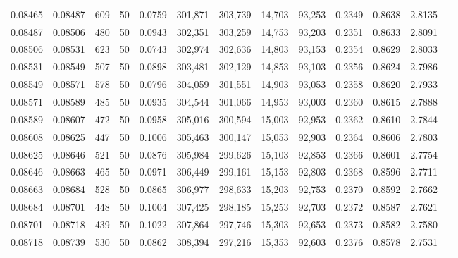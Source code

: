 \begin{tabular}{rrrrrrrrrrrrr}
0.08465 & 0.08487 &   609 &  50 &                                     0.0759 & 301,871 & 303,739 &  14,703 &  93,253 & 0.2349 & 0.8638 & 2.8135 \\
0.08487 & 0.08506 &   480 &  50 &                                     0.0943 & 302,351 & 303,259 &  14,753 &  93,203 & 0.2351 & 0.8633 & 2.8091 \\
0.08506 & 0.08531 &   623 &  50 &                                     0.0743 & 302,974 & 302,636 &  14,803 &  93,153 & 0.2354 & 0.8629 & 2.8033 \\
0.08531 & 0.08549 &   507 &  50 &                                     0.0898 & 303,481 & 302,129 &  14,853 &  93,103 & 0.2356 & 0.8624 & 2.7986 \\
0.08549 & 0.08571 &   578 &  50 &                                     0.0796 & 304,059 & 301,551 &  14,903 &  93,053 & 0.2358 & 0.8620 & 2.7933 \\
0.08571 & 0.08589 &   485 &  50 &                                     0.0935 & 304,544 & 301,066 &  14,953 &  93,003 & 0.2360 & 0.8615 & 2.7888 \\
0.08589 & 0.08607 &   472 &  50 &                                     0.0958 & 305,016 & 300,594 &  15,003 &  92,953 & 0.2362 & 0.8610 & 2.7844 \\
0.08608 & 0.08625 &   447 &  50 &                                     0.1006 & 305,463 & 300,147 &  15,053 &  92,903 & 0.2364 & 0.8606 & 2.7803 \\
0.08625 & 0.08646 &   521 &  50 &                                     0.0876 & 305,984 & 299,626 &  15,103 &  92,853 & 0.2366 & 0.8601 & 2.7754 \\
0.08646 & 0.08663 &   465 &  50 &                                     0.0971 & 306,449 & 299,161 &  15,153 &  92,803 & 0.2368 & 0.8596 & 2.7711 \\
0.08663 & 0.08684 &   528 &  50 &                                     0.0865 & 306,977 & 298,633 &  15,203 &  92,753 & 0.2370 & 0.8592 & 2.7662 \\
0.08684 & 0.08701 &   448 &  50 &                                     0.1004 & 307,425 & 298,185 &  15,253 &  92,703 & 0.2372 & 0.8587 & 2.7621 \\
0.08701 & 0.08718 &   439 &  50 &                                     0.1022 & 307,864 & 297,746 &  15,303 &  92,653 & 0.2373 & 0.8582 & 2.7580 \\
0.08718 & 0.08739 &   530 &  50 &                                     0.0862 & 308,394 & 297,216 &  15,353 &  92,603 & 0.2376 & 0.8578 & 2.7531 \\

\end{tabular}
